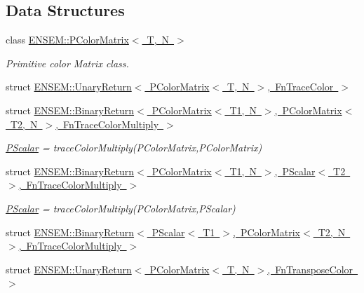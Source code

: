 \subsection*{Data Structures}
\begin{DoxyCompactItemize}
\item 
class \mbox{\hyperlink{classENSEM_1_1PColorMatrix}{E\+N\+S\+E\+M\+::\+P\+Color\+Matrix$<$ T, N $>$}}
\begin{DoxyCompactList}\small\item\em Primitive color Matrix class. \end{DoxyCompactList}\item 
struct \mbox{\hyperlink{structENSEM_1_1UnaryReturn_3_01PColorMatrix_3_01T_00_01N_01_4_00_01FnTraceColor_01_4}{E\+N\+S\+E\+M\+::\+Unary\+Return$<$ P\+Color\+Matrix$<$ T, N $>$, Fn\+Trace\+Color $>$}}
\item 
struct \mbox{\hyperlink{structENSEM_1_1BinaryReturn_3_01PColorMatrix_3_01T1_00_01N_01_4_00_01PColorMatrix_3_01T2_00_01N_a47a4c46ca38f78d2b12e618a0cca27a}{E\+N\+S\+E\+M\+::\+Binary\+Return$<$ P\+Color\+Matrix$<$ T1, N $>$, P\+Color\+Matrix$<$ T2, N $>$, Fn\+Trace\+Color\+Multiply $>$}}
\begin{DoxyCompactList}\small\item\em \mbox{\hyperlink{classENSEM_1_1PScalar}{P\+Scalar}} = trace\+Color\+Multiply(\+P\+Color\+Matrix,\+P\+Color\+Matrix) \end{DoxyCompactList}\item 
struct \mbox{\hyperlink{structENSEM_1_1BinaryReturn_3_01PColorMatrix_3_01T1_00_01N_01_4_00_01PScalar_3_01T2_01_4_00_01FnTraceColorMultiply_01_4}{E\+N\+S\+E\+M\+::\+Binary\+Return$<$ P\+Color\+Matrix$<$ T1, N $>$, P\+Scalar$<$ T2 $>$, Fn\+Trace\+Color\+Multiply $>$}}
\begin{DoxyCompactList}\small\item\em \mbox{\hyperlink{classENSEM_1_1PScalar}{P\+Scalar}} = trace\+Color\+Multiply(\+P\+Color\+Matrix,\+P\+Scalar) \end{DoxyCompactList}\item 
struct \mbox{\hyperlink{structENSEM_1_1BinaryReturn_3_01PScalar_3_01T1_01_4_00_01PColorMatrix_3_01T2_00_01N_01_4_00_01FnTraceColorMultiply_01_4}{E\+N\+S\+E\+M\+::\+Binary\+Return$<$ P\+Scalar$<$ T1 $>$, P\+Color\+Matrix$<$ T2, N $>$, Fn\+Trace\+Color\+Multiply $>$}}
\item 
struct \mbox{\hyperlink{structENSEM_1_1UnaryReturn_3_01PColorMatrix_3_01T_00_01N_01_4_00_01FnTransposeColor_01_4}{E\+N\+S\+E\+M\+::\+Unary\+Return$<$ P\+Color\+Matrix$<$ T, N $>$, Fn\+Transpose\+Color $>$}}

\end{DoxyCompactItemize}
